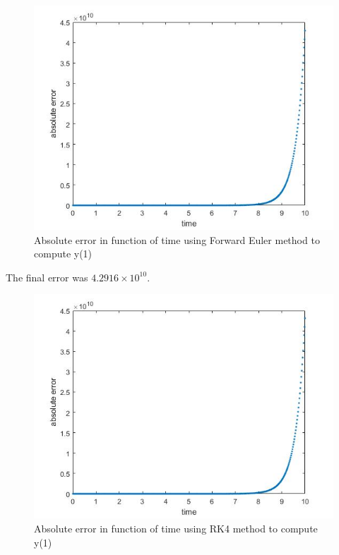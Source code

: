 \documentclass[a4paper, 11pt]{article}
\begin{document}
		\begin{figure}[H]
			\centering
			\includegraphics[width=\linewidth]{ex1_fe.jpg}
			\caption{Absolute error in function of time using Forward Euler method to compute y(1)}
			\label{fig:ex1_fe}
		\end{figure}
		
		The final error was $4.2916 \times 10^{10}$.
		
		\begin{figure}[H]
			\centering
			\includegraphics[width=\linewidth]{ex1_rk4.jpg}
			\caption{Absolute error in function of time using RK4 method to compute y(1)}
			\label{fig:ex1_rk4}
		\end{figure}
		
\end{document}
